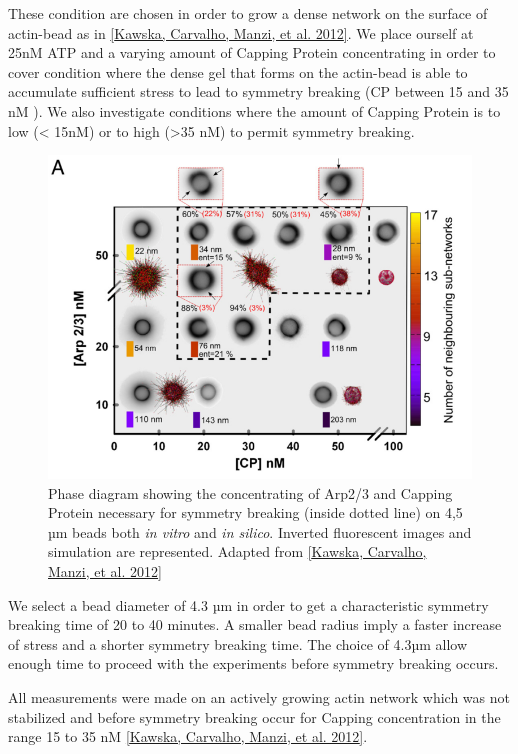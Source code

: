 \documentclass[A4paperpaper,11pt,english]{sphinxmanual}
\begin{document}
These condition are chosen in order to grow a dense network on the surface of
actin-bead as in {\hyperref[parts/part3:kawska2012]{{[}Kawska, Carvalho, Manzi,  et al.  2012{]}}}. We place ourself at 25nM ATP and a varying
amount of Capping Protein concentrating in order to cover condition where the
dense gel that forms on the actin-bead is able to accumulate sufficient stress
to lead to symmetry breaking (CP between 15  and 35 nM ). We also investigate
conditions where the amount of Capping Protein is to low (\textless{} 15nM) or to high
(\textgreater{}35 nM) to permit symmetry breaking.
\begin{figure}[htbp]
\centering
\capstart

\includegraphics[width=0.900\linewidth]{kawska-phase-diagram.png}
\caption{Phase diagram showing the concentrating of Arp2/3 and Capping Protein
necessary for symmetry breaking (inside dotted line) on 4,5 µm beads both
\emph{in vitro} and \emph{in silico}. Inverted fluorescent images and simulation
are represented. Adapted from {\hyperref[parts/part3:kawska2012]{{[}Kawska, Carvalho, Manzi,  et al.  2012{]}}}}\end{figure}

We select a bead diameter of 4.3 µm in order to get a characteristic symmetry
breaking time of 20 to 40 minutes.
A smaller bead radius imply a
faster increase of stress and a shorter symmetry breaking time.
The choice of 4.3µm allow enough time to proceed with the
experiments before symmetry breaking occurs.

All measurements were made on an actively growing actin network which
was not stabilized and before symmetry breaking
occur for Capping concentration in the range 15 to 35 nM {\hyperref[parts/part3:kawska2012]{{[}Kawska, Carvalho, Manzi,  et al.  2012{]}}}.
\end{document}
